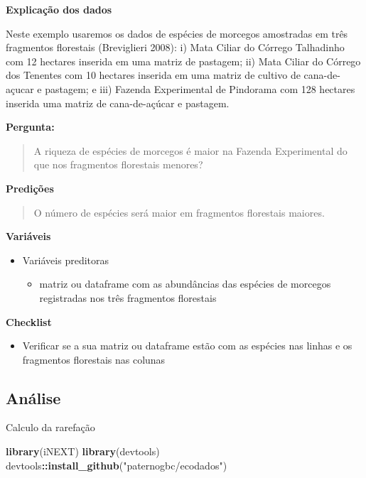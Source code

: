 \documentclass[
]{book}
\newenvironment{Shaded}{\begin{snugshade}}{\end{snugshade}}
\newcommand{\KeywordTok}[1]{\textcolor[rgb]{0.13,0.29,0.53}{\textbf{#1}}}
\newcommand{\NormalTok}[1]{#1}
\newcommand{\OperatorTok}[1]{\textcolor[rgb]{0.81,0.36,0.00}{\textbf{#1}}}
\newcommand{\StringTok}[1]{\textcolor[rgb]{0.31,0.60,0.02}{#1}}
\providecommand{\tightlist}{%
  \setlength{\itemsep}{0pt}\setlength{\parskip}{0pt}}
\begin{document}
\textbf{Explicação dos dados}

Neste exemplo usaremos os dados de espécies de morcegos amostradas em três fragmentos florestais (Breviglieri 2008): i) Mata Ciliar do Córrego Talhadinho com 12 hectares inserida em uma matriz de pastagem; ii) Mata Ciliar do Córrego dos Tenentes com 10 hectares inserida em uma matriz de cultivo de cana-de-açucar e pastagem; e iii) Fazenda Experimental de Pindorama com 128 hectares inserida uma matriz de cana-de-açúcar e pastagem.

\textbf{Pergunta:}

\begin{quote}
A riqueza de espécies de morcegos é maior na Fazenda Experimental do que nos fragmentos florestais menores?
\end{quote}

\textbf{Predições}

\begin{quote}
O número de espécies será maior em fragmentos florestais maiores.
\end{quote}

\textbf{Variáveis}

\begin{itemize}
\tightlist
\item
  Variáveis preditoras

  \begin{itemize}
  \tightlist
  \item
    matriz ou dataframe com as abundâncias das espécies de morcegos registradas nos três fragmentos florestais
  \end{itemize}
\end{itemize}

\textbf{Checklist}

\begin{itemize}
\tightlist
\item
  Verificar se a sua matriz ou dataframe estão com as espécies nas linhas e os fragmentos florestais nas colunas
\end{itemize}

\hypertarget{anuxe1lise}{%
\subsection{Análise}\label{anuxe1lise}}

Calculo da rarefação

\begin{Shaded}
\begin{Highlighting}[]
\KeywordTok{library}\NormalTok{(iNEXT)}
\KeywordTok{library}\NormalTok{(devtools)}
\NormalTok{devtools}\OperatorTok{::}\KeywordTok{install_github}\NormalTok{(}\StringTok{"paternogbc/ecodados"}\NormalTok{)}
\end{Highlighting}
\end{Shaded}
\end{document}
